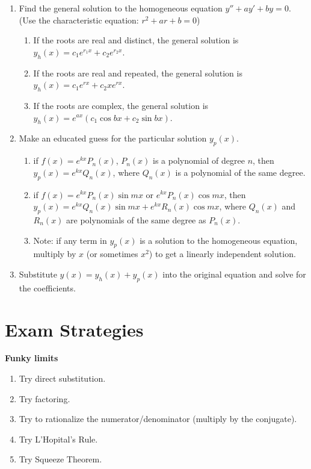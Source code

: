 \documentclass[12pt]{article}
\begin{document}
\begin{enumerate}
  \item Find the general solution to the homogeneous equation $y'' + ay' + by = 0$. (Use the characteristic equation: $r^2 + ar + b = 0$)
    \begin{enumerate}
      \item If the roots are real and distinct, the general solution is $y_h(x) = c_1 e^{r_1 x} + c_2 e^{r_2 x}$.
      \item If the roots are real and repeated, the general solution is $y_h(x) = c_1 e^{r x} + c_2 x e^{r x}$.
      \item If the roots are complex, the general solution is $y_h(x) = e^{ax} (c_1 \cos bx + c_2 \sin bx)$.
    \end{enumerate}
  \item Make an educated guess for the particular solution $y_p(x)$.
    \begin{enumerate}
      \item if $f(x) = e^{kx}P_n(x)$, $P_n(x)$ is a polynomial of degree $n$, then $y_p(x) = e^{kx}Q_n(x)$, where $Q_n(x)$ is a polynomial of the same degree. 
      \item if $f(x) = e^{kx}P_n(x) \sin mx$ or $e^{kx}P_n(x) \cos mx$, then $y_p(x) = e^{kx}Q_n(x) \sin mx + e^{kx}R_n(x) \cos mx$, where $Q_n(x)$ and $R_n(x)$ are polynomials of the same degree as $P_n(x)$.
      \item Note: if any term in $y_p(x)$ is a solution to the homogeneous equation, multiply by $x$ (or sometimes $x^2$) to get a linearly independent solution.
    \end{enumerate}
  \item Substitute $y(x) = y_h(x) + y_p(x)$ into the original equation and solve for the coefficients.
\end{enumerate}

\section{Exam Strategies}

\begin{mdframed}
  \textbf{Funky limits}

  \begin{enumerate}
    \item Try direct substitution.
    \item Try factoring.
    \item Try to rationalize the numerator/denominator (multiply by the conjugate).
    \item Try L'Hopital's Rule.
    \item Try Squeeze Theorem.
  \end{enumerate}
\end{mdframed}
\end{document}
